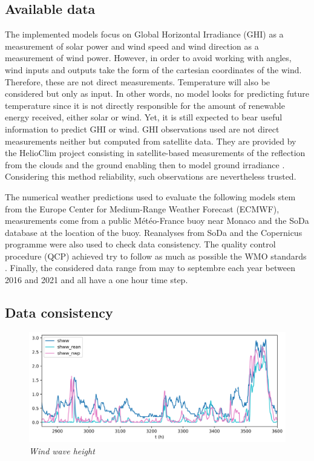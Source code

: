 \documentclass{article}
\newcommand{\saut}{\vspace{10px}}
\begin{document}
\subsection*{Available data}

The implemented models focus on Global Horizontal Irradiance (GHI) as a measurement of solar power
and wind speed and wind direction as a measurement of wind power.
However, in order to avoid working with angles, wind inputs and outputs
take the form of the cartesian coordinates of the wind. Therefore, these are not direct measurements. Temperature will
also be considered but only as input. In other words, no model looks for predicting future temperature since it is
not directly responsible for the amount of renewable energy received, either solar or wind. Yet, it is still expected to
bear useful information to predict GHI or wind. GHI observations used are not direct measurements neither but
computed from satellite data. They are provided by the HelioClim project consisting in satellite-based measurements
of the reflection from the clouds and the ground enabling then to model ground irradiance
\cite{blanc_helioclim_2011}. Considering this method reliability, such observations are nevertheless trusted.

\saut

The numerical weather predictions used to evaluate the following models 
stem from the Europe Center for Medium-Range Weather Forecast (ECMWF), measurements come from a public
Météo-France buoy near Monaco and the SoDa database at the location of the buoy. Reanalyses from SoDa and
the Copernicus programme were also used to check data consistency. The quality control procedure (QCP) achieved
try to follow as much as possible the WMO standards \cite{organization_wmo_guidelines_2021}. Finally,
the considered data range from may to septembre each year between 2016 and 2021 and all have a one hour
time step.

\subsection*{Data consistency}

\begin{figure}[H]
    \centering
    \includegraphics[width=.95\linewidth]{img/shww.png}
    \caption{\textit{Wind wave height}}
   \label{shww}
\end{figure}
\end{document}
